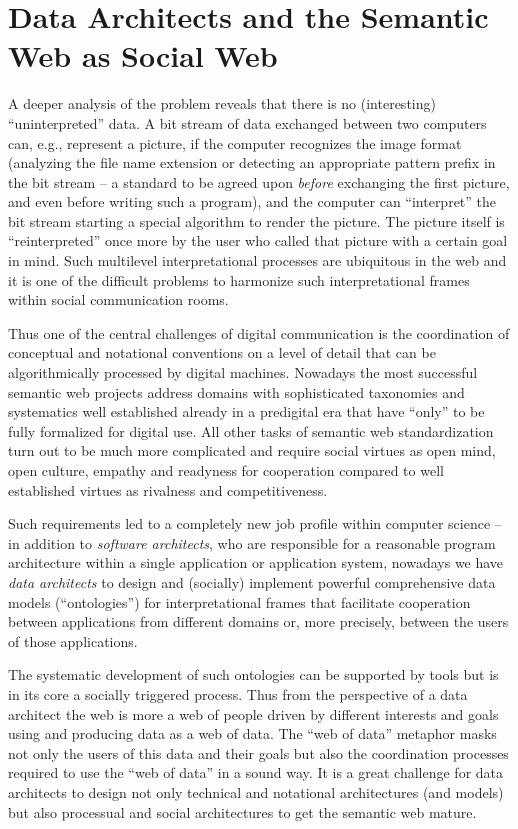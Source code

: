 \documentclass{llncs}
\begin{document}
\section{Data Architects and the Semantic Web as Social Web}

A deeper analysis of the problem reveals that there is no (interesting)
``uninterpreted'' data. A bit stream of data exchanged between two computers
can, e.g., represent a picture, if the computer recognizes the image format
(analyzing the file name extension or detecting an appropriate pattern prefix
in the bit stream -- a standard to be agreed upon \emph{before} exchanging the
first picture, and even before writing such a program), and the computer can
``interpret'' the bit stream starting a special algorithm to render the
picture.  The picture itself is ``reinterpreted'' once more by the user who
called that picture with a certain goal in mind. Such multilevel
interpretational processes are ubiquitous in the web and it is one of the
difficult problems to harmonize such interpretational frames within social
communication rooms.

Thus one of the central challenges of digital communication is the coordination
of conceptual and notational conventions on a level of detail that can be
algorithmically processed by digital machines.  Nowadays the most successful
semantic web projects address domains with sophisticated taxonomies and
systematics well established already in a predigital era that have ``only'' to
be fully formalized for digital use.  All other tasks of semantic web
standardization turn out to be much more complicated and require social virtues
as open mind, open culture, empathy and readyness for cooperation compared to
well established virtues as rivalness and competitiveness.

Such requirements led to a completely new job profile within computer science
-- in addition to \emph{software architects}, who are responsible for a
reasonable program architecture within a single application or application
system, nowadays we have \emph{data architects} to design and (socially)
implement powerful comprehensive data models (``ontologies'') for
interpretational frames that facilitate cooperation between applications from
different domains or, more precisely, between the users of those applications.

The systematic development of such ontologies can be supported by tools but is
in its core a socially triggered process.  Thus from the perspective of a data
architect the web is more a web of people driven by different interests and
goals using and producing data as a web of data. The ``web of data'' metaphor
masks not only the users of this data and their goals but also the coordination
processes required to use the ``web of data'' in a sound way.  It is a great
challenge for data architects to design not only technical and notational
architectures (and models) but also processual and social architectures to get
the semantic web mature. 
\end{document}
